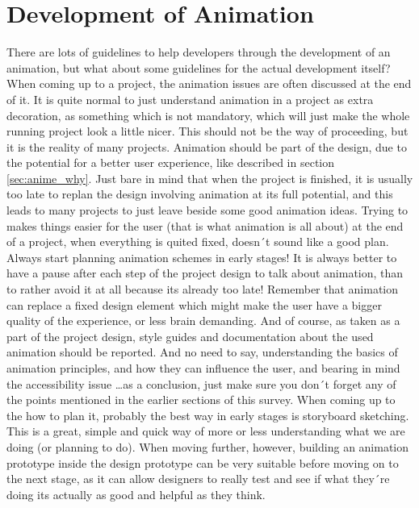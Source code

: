\section{Development of Animation} %
\label{sec:anime_dev}

There are lots of guidelines to help developers through the development of an animation, but what about some guidelines for the actual development itself? When coming up to a project, the animation issues are often discussed at the end of it. It is quite normal to just understand animation in a project as extra decoration, as something which is not mandatory, which will just make the whole running project look a little nicer. This should not be the way of proceeding, but it is the reality of many projects. Animation should be part of the design, due to the potential for a better user experience, like described in section \ref{sec:anime_why}. Just bare in mind that when the project is finished, it is usually too late to replan the design involving animation at its full potential, and this leads to many projects to just leave beside some good animation ideas.
Trying to makes things easier for the user (that is what animation is all about) at the end of a project, when everything is quited fixed, doesn´t sound like a good plan. Always start planning animation schemes in early stages! It is always better to have a pause after each step of the project design to talk about animation, than to rather avoid it at all because its already too late! Remember that animation can replace a fixed design element which might make the user have a bigger quality of the experience, or less brain demanding. And of course, as taken as a part of the project design, style guides and documentation about the used animation should be reported. And no need to say, understanding the basics of animation principles, and how they can influence the user, and bearing in mind the accessibility issue \ldots as a conclusion, just make sure you don´t forget any of the points mentioned in the earlier sections of this survey. When coming up to the how to plan it, probably the best way in early stages is storyboard sketching. This is a great, simple and quick way of more or less understanding what we are doing (or planning to do). When moving further, however, building an animation prototype inside the design prototype can be very suitable before moving on to the next stage, as it can allow designers to really test and see if what they´re doing its actually as good and helpful as they think.


